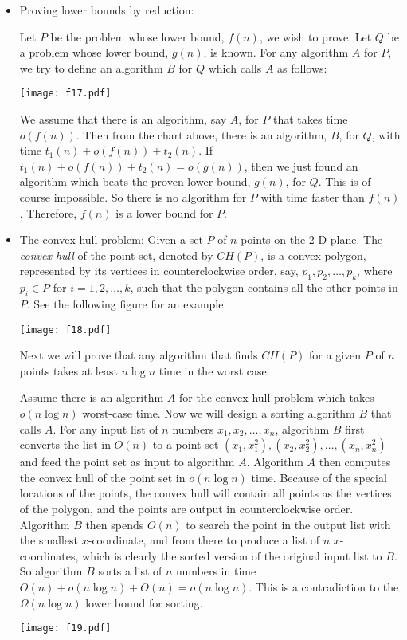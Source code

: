 \documentclass{article}
\begin{document}
\begin{itemize}

\item Proving lower bounds by reduction:

Let $P$ be the problem whose lower bound, $f(n)$, we wish to prove.
Let $Q$ be a problem whose lower bound, $g(n)$, is known. For any 
algorithm $A$ for $P$, we try to define an algorithm $B$ for $Q$ which
calls $A$ as follows:

\vskip 0.25cm
\begin{center}
\texttt{[image: f17.pdf]}
\end{center}

We assume that there is an algorithm, say $A$, for $P$ that takes
time $o(f(n))$. Then from the chart above, there is an algorithm,
$B$, for $Q$, with time $t_1(n)+o(f(n))+t_2(n)$. If $t_1(n)+o(f(n))+t_2(n)
=o(g(n))$, then we just found an algorithm which beats the proven
lower bound, $g(n)$, for $Q$. This is of course impossible. 
So there is no algorithm for $P$ with time faster than $f(n)$.
Therefore, $f(n)$ is a lower bound for $P$.

\item The convex hull problem: Given a set $P$ of $n$ points on the 2-D plane.
The {\em convex hull} of the point set, denoted by $CH(P)$, is a convex
polygon, represented by its vertices in counterclockwise order, say,
$p_1, p_2, \ldots, p_k$, where $p_i\in P$ for $i=1, 2, \ldots, k$,
such that the polygon contains all the other points in $P$. See the
following figure for an example.

\vskip 0.25cm
\begin{center}
\texttt{[image: f18.pdf]}
\end{center}

Next we will prove that any algorithm that finds $CH(P)$ for a given
$P$ of $n$ points takes at least $n\log n$ time in the worst case.

Assume there is an algorithm $A$ for the convex hull problem which
takes $o(n\log n)$ worst-case time. Now we will design a sorting
algorithm $B$ that calls $A$. For any input list of $n$ numbers
$x_1, x_2, \ldots, x_n$, algorithm $B$ first converts the list in $O(n)$
to a point set $(x_1, x_1^2), (x_2, x_2^2), \ldots, (x_n, x_n^2)$
and feed the point set as input to algorithm $A$. Algorithm $A$ then
computes the convex hull of the point set in $o(n \log n)$ time.
Because of the special locations of the points, the convex hull will
contain all points as the vertices of the polygon, and the points
are output in counterclockwise order. Algorithm $B$ then spends $O(n)$
to search the point in the output list with the smallest $x$-coordinate,
and from there to produce a list of $n$ $x$-coordinates, which is clearly
the sorted version of the original input list to $B$. So algorithm $B$
sorts a list of $n$ numbers in time $O(n)+o(n\log n)+O(n)=o(n\log n)$.
This is a contradiction to the $\Omega(n\log n)$ lower bound for sorting.

\vskip 0.25cm
\begin{center}
\texttt{[image: f19.pdf]}
\end{center}

\end{itemize}
\end{document}
